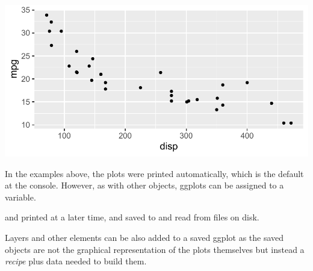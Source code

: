 \documentclass[krantz2]{krantz}\usepackage{knitr}
\begin{document}
\begin{knitrout}\footnotesize
{}\color{fgcolor}\begin{kframe}
\begin{alltt}
\hlstd{(} 
        \hlstd{=} \hlstd{(}    \hlopt{+}
  \hlstd{()}
\end{alltt}
\end{kframe}

{\centering \includegraphics[width=.7\textwidth]{figure/pos-ggplot-basics-04-1} 

}


\end{knitrout}

\begin{warningbox}
In the examples above, the plots were printed automatically, which is the default at the \Rlang console. However, as with other \Rlang objects, ggplots can be assigned to a variable.

\begin{knitrout}\footnotesize
{}\color{fgcolor}\begin{kframe}
\begin{alltt}
 \hlkwb{<-} \hlstd{(} 
              \hlstd{=} \hlstd{(}    \hlopt{+}
       \hlstd{()}
\end{alltt}
\end{kframe}
\end{knitrout}

and printed at a later time, and saved to and read from files on disk.

\begin{knitrout}\footnotesize
{}\color{fgcolor}\begin{kframe}
\begin{alltt}
\end{alltt}
\end{kframe}
\end{knitrout}

Layers and other elements can be also added to a saved ggplot as the saved objects are not the graphical representation of the plots themselves but instead a \emph{recipe} plus data needed to build them.
\end{warningbox}
\end{document}

